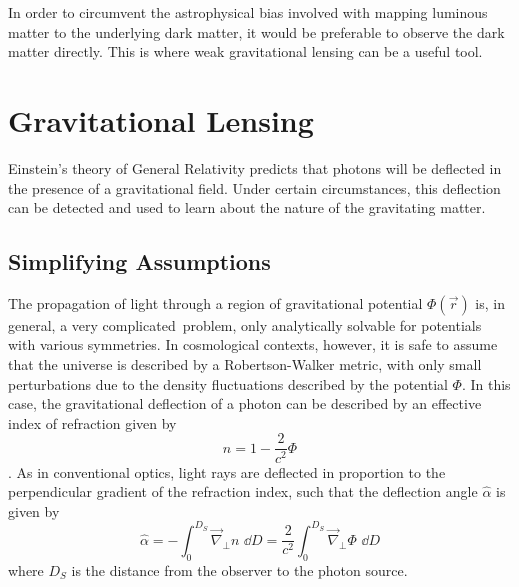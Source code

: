In order to circumvent the astrophysical bias
involved with mapping luminous matter to
the underlying dark matter, it would be preferable to observe the dark
matter directly.  This is where weak gravitational lensing can be a
useful tool.



\section{Gravitational Lensing}
\label{sec:gravitational_lensing}
Einstein's theory of General Relativity predicts that photons will be deflected
in the presence of a gravitational field.  Under certain circumstances, this
deflection can be detected and used to learn about the nature of the
gravitating matter.

\subsection{Simplifying Assumptions}
\label{sec:lensing_simplification}
The propagation of light through a region of gravitational potential
$\Phi(\vec{r})$ is, in general, a very complicated\ problem, only analytically
solvable for potentials with various symmetries.  In cosmological contexts,
however, it is safe to assume that the universe is described by a
Robertson-Walker metric, with only small perturbations due to the density
fluctuations described by the potential $\Phi$.  In this case, the
gravitational deflection of a photon can be described by an effective
index of refraction given by
\begin{equation}
  n = 1-\frac{2}{c^2}\Phi 
\end{equation}
\citep[see][and references therein]{narayan1996lectures}.
As in conventional optics, light rays are deflected in proportion to the
perpendicular gradient of the refraction index, such that the deflection angle
$\hat{\alpha}$ is given by
\begin{equation}
  \label{eq:alpha-def}
  \hat{\alpha} = -\int_0^{D_S} \vec{\nabla}_\perp n \,\,\dd D
  = \frac{2}{c^2}\int_0^{D_S} \vec{\nabla}_\perp\Phi\,\,\dd D
\end{equation}
where $D_S$ is the distance from the observer to the photon source.  

